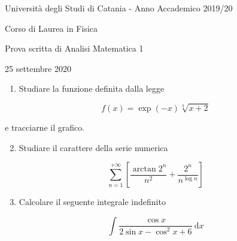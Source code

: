 \documentclass[10pt]{article}
\begin{document}
Università degli Studi di Catania - Anno Accademico 2019/20

Corso di Laurea in Fisica

Prova scritta di Analisi Matematica 1

25 settembre 2020

\begin{enumerate}
  \item Studiare la funzione definita dalla legge
\end{enumerate}

\[
f(x)=\exp (-x) \sqrt[3]{x+2}
\]

e tracciarne il grafico.

\begin{enumerate}
  \setcounter{enumi}{1}
  \item Studiare il carattere della serie numerica
\end{enumerate}

\[
\sum_{n=1}^{+\infty}\left[\frac{\arctan 2^{n}}{n^{2}}+\frac{2^{n}}{n^{\log n}}\right]
\]

\begin{enumerate}
  \setcounter{enumi}{2}
  \item Calcolare il seguente integrale indefinito
\end{enumerate}

\[
\int \frac{\cos x}{2 \sin x-\cos ^{2} x+6} \mathrm{~d} x
\]
\end{document}
